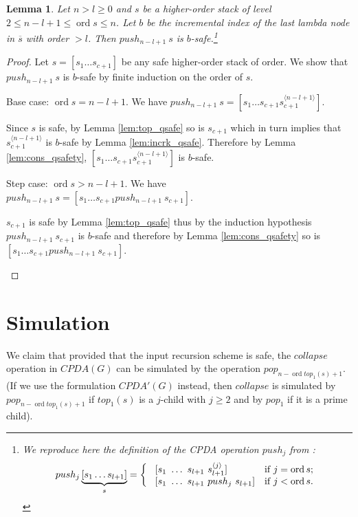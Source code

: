 \documentclass{article}
\newcommand{\ord}{\mathop{\mathrm{ord}}}
\newtheorem{lemma}{Lemma}[section]
\theoremstyle{remark}
\theoremstyle{definition}
\newcommand\orddec\overline
\begin{document}
\begin{lemma}
\label{lem:pushj_safe_implies_b-safe} Let $n>l\geq 0$ and $s$ be a higher-order stack
of level $2 \leq n-l+1 \leq \ord{s} \leq n$. Let $b$ be the incremental index of the last lambda node in $\orddec{s}$ with order $>l$. Then $push_{n-l+1}\ s$ is $b$-safe.\footnote{We reproduce here the definition of the
CPDA operation $push_j$ from \cite{hague-sto07}:
$$ push_j \underbrace{[ s_1 \ldots s_{l+1} ]}_{s} =
\left\{
  \begin{array}{ll}
\    [s_1\ \ldots\ s_{l+1}\ s_{l+1}^{\langle j \rangle}]  &\hbox{if $j = \ord{s}$;}\\
\    [s_1\ \ldots\ s_{l+1}\ push_j\ s_{l+1}]  &\hbox{if $j<\ord{s}$.}
 \end{array}
\right.
$$}
\end{lemma}
\begin{proof}
Let $s=[s_1 \ldots s_{c+1}]$ be any safe higher-order stack of order. We show that $push_{n-l+1}~s$ is $b$-safe by finite induction on the order of $s$.
    \begin{compactitem}
      \item Base case: $\ord{s} = n-l+1 $. We have
    $push_{n-l+1}~s = [ s_1 \ldots s_{c+1} s_{c+1}^{\langle n-l+1
    \rangle}]$.

    Since $s$ is safe, by Lemma \ref{lem:top_qsafe} so is $s_{c+1}$
    which in turn implies that $s_{c+1}^{\langle n-l+1\rangle}$ is
    $b$-safe by Lemma \ref{lem:incrk_qsafe}. Therefore by Lemma
    \ref{lem:cons_qsafety},  $[ s_1 \ldots s_{c+1} s_{c+1}^{\langle n-l+1
    \rangle}]$ is $b$-safe.

      \item Step case: $\ord{s} > n-l+1$. We have
    $push_{n-l+1}~s = [ s_1 \ldots s_{c+1} push_{n-l+1}~s_{c+1}]$.

    $s_{c+1}$ is safe by Lemma \ref{lem:top_qsafe} thus by the
    induction hypothesis $push_{n-l+1}~s_{c+1}$ is $b$-safe and therefore by Lemma \ref{lem:cons_qsafety} so
    is $[ s_1 \ldots s_{c+1} push_{n-l+1}~s_{c+1}]$.
    \end{compactitem}
\end{proof}





\section{Simulation}

We claim that provided that the input recursion scheme is safe, the
$collapse$ operation in $CPDA(G)$ can be simulated by the operation
$pop_{n-\ord{top_1(s)}+1}$. (If we use the formulation $CPDA'(G)$ instead, then
$collapse$ is simulated by $pop_{n-\ord{top_1(s)}+1}$ if $top_1(s)$
is a $j$-child with $j\geq 2$ and by $pop_1$ if it is a prime
child).
\end{document}
